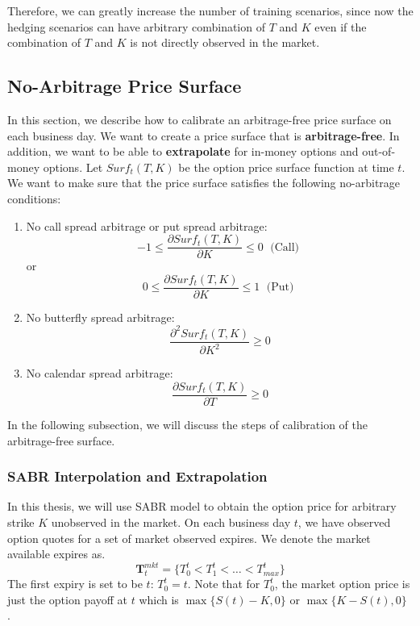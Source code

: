 \documentclass[letterpaper,12pt,titlepage,oneside,final]{book}
\numberwithin{equation}{section}
\theoremstyle{definition}
\begin{document}
Therefore, we can greatly increase the number of training scenarios, since now the hedging scenarios can have arbitrary combination of $T$ and $K$ even if the combination of $T$ and $K$ is not directly observed in the market. 

\subsection{No-Arbitrage Price Surface}
\label{sec:NoArb}
In this section, we describe how to calibrate an arbitrage-free price surface on each business day. We want to create a price surface that is \textbf{arbitrage-free}. In addition, we want to be able to \textbf{extrapolate} for  in-money options and out-of-money options. 
Let  $Surf_{t}(T,K)$ be the option price surface function at time $t$. We want to make sure that the price surface satisfies the following no-arbitrage conditions:
\begin{enumerate}
		\item No call spread arbitrage or put spread arbitrage:
		\[
		-1 \leq \frac{\partial Surf_{t}(T,K)}{ \partial K} \leq 0
		\; \text{ (Call) }
		\]
		or
		\[
			0 \leq \frac{\partial Surf_{t}(T,K)}{ \partial K} \leq 1
			\; \text{ (Put) }
		\]
		\item  No butterfly spread arbitrage:
		\[
		\frac{\partial^2 Surf_{t}(T,K)}{ \partial K^2} \geq 0
		\]
		\item  No calendar spread arbitrage:
		\[
		\frac{\partial Surf_{t}(T,K)}{ \partial T} \geq 0
		\]
\end{enumerate}
In the following subsection, we will discuss the steps of calibration of the arbitrage-free surface.
\subsubsection{SABR Interpolation and Extrapolation}
In this thesis, we will use SABR model to obtain the option price for arbitrary strike $K$ unobserved in the market.
On each business day $t$, we have observed option quotes for a set of market observed expires. We denote the market available expires as.
\[
\mathbf{T}^{mkt}_t=\{ T^{t}_{0}<
T^{t}_1 < \dots< T^{t}_{max}
\}
\]
The first expiry is set to be $t$: $T^{t}_{0}=t$. Note that for $T^{t}_{0}$, the market option price is just the option payoff at $t$ which is $\max\{S(t)-K,0\}$ or  $\max\{K-S(t),0\}$ . 
\end{document}
